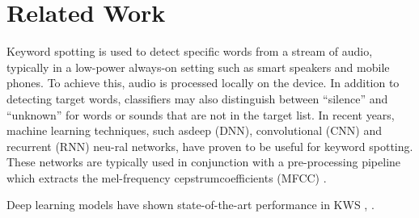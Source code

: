 
\section{Related Work}
Keyword spotting is used to detect specific words from a stream of  audio,  typically  in  a  low-power  always-on  setting  such  as smart speakers and mobile phones.   To achieve this,  audio is processed locally on the device.  In addition to detecting target words,  classifiers may also distinguish between ``silence'' and ``unknown'' for words or sounds that are not in the target list. In  recent  years,   machine  learning  techniques,   such  asdeep (DNN), convolutional (CNN) and recurrent (RNN) neu-ral  networks,  have  proven  to  be  useful  for  keyword  spotting. These networks are typically used in conjunction with a pre-processing pipeline which extracts the mel-frequency cepstrumcoefficients (MFCC) \cite{davis1980comparison}. 


Deep learning models have shown state-of-the-art performance in KWS \cite{hinton2012deep}, \cite{sainath2013deep}. 



